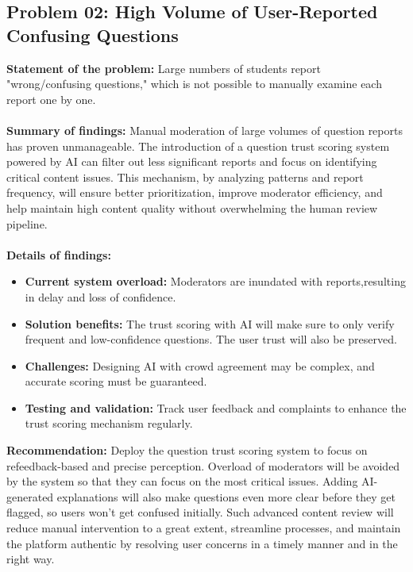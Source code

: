\documentclass[12pt,a4paper,oneside]{book}
\begin{document}
\subsection{Problem 02: High Volume of User-Reported Confusing Questions}
\textbf{Statement of the problem:} Large numbers of students report "wrong/confusing questions," which is not possible to manually examine each report one by one.\\ \\
\textbf{Summary of findings:} Manual moderation of large volumes of question reports has proven unmanageable. The introduction of a question trust scoring system powered by AI can filter out less significant reports and focus on identifying critical content issues. This mechanism, by analyzing patterns and report frequency, will ensure better prioritization, improve moderator efficiency, and help maintain high content quality without overwhelming the human review pipeline.\\ \\
\textbf{Details of findings:}
\begin{itemize}
    \item \textbf{Current system overload:} Moderators are inundated with reports,resulting in delay and loss of confidence.
    \item \textbf{Solution benefits:} The trust scoring with AI will make sure to only verify frequent and low-confidence questions. The user trust will also be preserved.
    \item \textbf{Challenges:} Designing AI with crowd agreement may be complex, and accurate scoring must be guaranteed.
    \item \textbf{Testing and validation:} Track user feedback and complaints to enhance the trust scoring mechanism regularly.

\end{itemize}
\textbf{Recommendation:} Deploy the question trust scoring system to focus on refeedback-based and precise perception. Overload of moderators will be avoided by the system so that they can focus on the most critical issues. Adding AI-generated explanations will also make questions even more clear before they get flagged, so users won't get confused initially. Such advanced content review will reduce manual intervention to a great extent, streamline processes, and maintain the platform authentic by resolving user concerns in a timely manner and in the right way.
\end{document}
